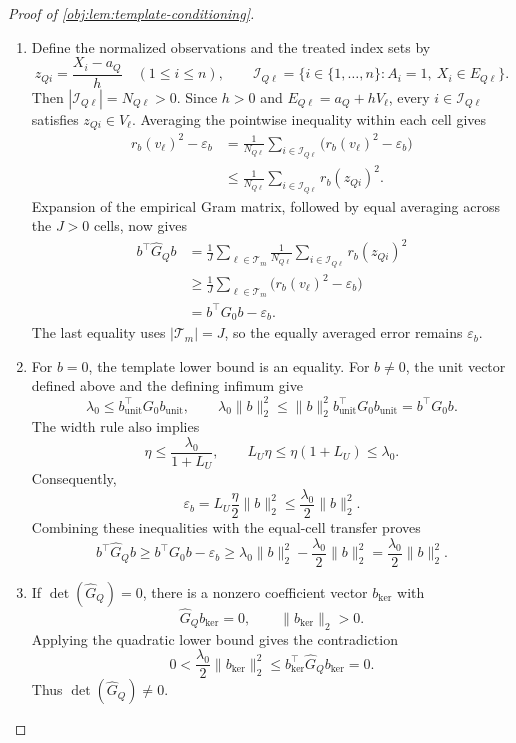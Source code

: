 \begin{proof}[Proof of \cref{obj:lem:template-conditioning}]
\begin{enumerate}
\item Define the normalized observations and the treated index sets by
\[
z_{Qi}=\frac{X_i-a_Q}{h}\quad(1\le i\le n),
\qquad
\mathcal I_{Q\ell}
=\{i\in\{1,\ldots,n\}:A_i=1,\ X_i\in E_{Q\ell}\}.
\]
Then \(|\mathcal I_{Q\ell}|=N_{Q\ell}>0\). Since \(h>0\) and
\(E_{Q\ell}=a_Q+hV_\ell\), every \(i\in\mathcal I_{Q\ell}\) satisfies
\(z_{Qi}\in V_\ell\). Averaging the pointwise inequality within each cell gives
\[
\begin{aligned}
r_b(v_\ell)^2-\varepsilon_b
&=\frac1{N_{Q\ell}}\sum_{i\in\mathcal I_{Q\ell}}
\bigl(r_b(v_\ell)^2-\varepsilon_b\bigr)\\
&\le\frac1{N_{Q\ell}}\sum_{i\in\mathcal I_{Q\ell}}r_b(z_{Qi})^2.
\end{aligned}
\]
Expansion of the empirical Gram matrix, followed by equal averaging across the \(J>0\) cells, now gives
\[
\begin{aligned}
b^\top\widehat G_Qb
&=\frac1J\sum_{\ell\in\mathcal T_m}
\frac1{N_{Q\ell}}\sum_{i\in\mathcal I_{Q\ell}}r_b(z_{Qi})^2\\
&\ge\frac1J\sum_{\ell\in\mathcal T_m}
\bigl(r_b(v_\ell)^2-\varepsilon_b\bigr)\\
&=b^\top G_0b-\varepsilon_b.
\end{aligned}
\]
The last equality uses \(|\mathcal T_m|=J\), so the equally averaged error remains \(\varepsilon_b\).

\item For \(b=0\), the template lower bound is an equality. For \(b\ne0\), the unit vector defined above and the defining infimum give
\[
\lambda_0\le b_{\mathrm{unit}}^\top G_0b_{\mathrm{unit}},
\qquad
\lambda_0\|b\|_2^2
\le\|b\|_2^2b_{\mathrm{unit}}^\top G_0b_{\mathrm{unit}}
=b^\top G_0b.
\]
The width rule also implies
\[
\eta\le\frac{\lambda_0}{1+L_U},
\qquad
L_U\eta\le\eta(1+L_U)\le\lambda_0.
\]
Consequently,
\[
\varepsilon_b
=L_U\frac{\eta}{2}\|b\|_2^2
\le\frac{\lambda_0}{2}\|b\|_2^2.
\]
Combining these inequalities with the equal-cell transfer proves
\[
b^\top\widehat G_Qb
\ge b^\top G_0b-\varepsilon_b
\ge\lambda_0\|b\|_2^2-\frac{\lambda_0}{2}\|b\|_2^2
=\frac{\lambda_0}{2}\|b\|_2^2.
\]

\item If \(\det(\widehat G_Q)=0\), there is a nonzero coefficient vector \(b_{\ker}\) with
\[
\widehat G_Qb_{\ker}=0,
\qquad
\|b_{\ker}\|_2>0.
\]
Applying the quadratic lower bound gives the contradiction
\[
0<\frac{\lambda_0}{2}\|b_{\ker}\|_2^2
\le b_{\ker}^\top\widehat G_Qb_{\ker}=0.
\]
Thus \(\det(\widehat G_Q)\ne0\).


\end{enumerate}
\end{proof}
